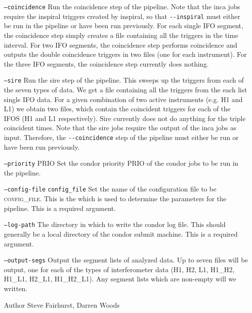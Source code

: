 \begin{entry}
\begin{entry}
\item[\texttt{--coincidence}] Run the coincidence step of the pipeline.  Note
that the inca jobs require the inspiral triggers created by inspiral, so that
\verb$--inspiral$ must either be run in the pipeline or have been run
previously.  For each single IFO segment, the coincidence step simply creates
a file containing all the triggers in the time interval.  For two IFO
segments, the coincidence step performs coincidence and outputs the double
coincidence triggers in two files (one for each instrument).  For the three
IFO segments, the coincidence step currently does nothing.  
\end{entry} 

\begin{entry}
\item[\texttt{--sire}] Run the sire step of the pipeline.  This sweeps up the
triggers from each of the seven types of data.  We get a file containing all
the triggers from the each list single IFO data.  For a given combination of
two active instruments (e.g. H1 and L1) we obtain two files, which contain the
coincident triggers for each of the IFOS (H1 and L1 respectively).  Sire
currently does not do anything for the triple coincident times.  Note that the
sire jobs require the output of the inca jobs as input.  Therefore, the
\verb$--coincidence$ step of the pipeline must either be run or have been run
previously.
\end{entry} 

\begin{entry}
\item[\texttt{--priority} \textsc{PRIO}] Set the condor priority \textsc{PRIO}
of the condor jobs to be run in the pipeline.
\end{entry} 

\begin{entry}
\item[\texttt{--config-file} \texttt{config\_file}] Set the name of the
configuration file to be \textsc{config\_file}.  This is the which is used to
determine the parameters for the pipeline.  This is a required argument.
\end{entry} 
 
\begin{entry}
\item[\texttt{--log-path}] The directory in which to write the condor log
file.  This should generally be a local directory of the condor submit
machine.  This is a required argument.
\end{entry} 

\begin{entry}
\item[\texttt{--output-segs}] Output the segment lists of analyzed data.  Up
to seven files will be output, one for each of the types of interferometer
data (H1, H2, L1, H1\_H2, H1\_L1, H2\_L1, H1\_H2\_L1).  Any segment lists
which are non-empty will we written.
\end{entry} 


\item[Author] 
Steve Fairhurst, Darren Woods
\end{entry}
